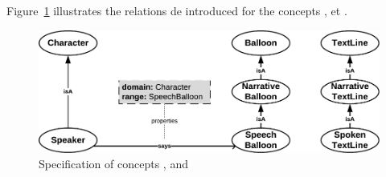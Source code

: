 Figure~\ref{fig:model_d_3} illustrates the relations de introduced for the concepts ,  et .

\begin{figure}[h!]
\begin{center}
\includegraphics[width=1\textwidth]{model_step2ter_new.pdf}
\caption{Specification of concepts ,  and }
\label{fig:model_d_3}
\end{center}
\end{figure}






